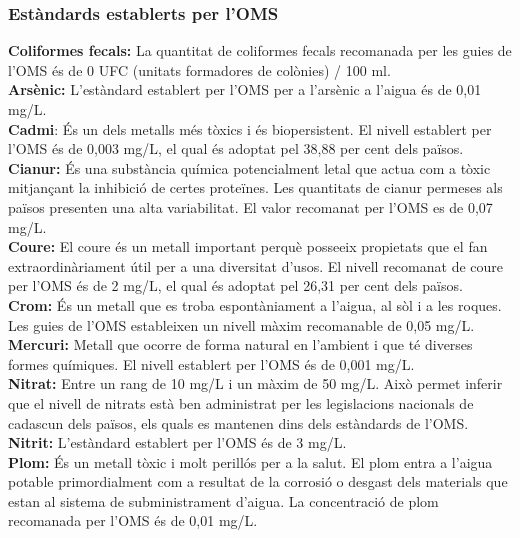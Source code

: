 \subsubsection{Estàndards establerts per l’OMS}
\textbf{Coliformes fecals:} La quantitat de coliformes fecals recomanada per les guies de l’OMS és de 0 UFC (unitats formadores de colònies) / 100 ml.\\

\textbf{Arsènic:} L’estàndard establert per l’OMS per a l’arsènic a l’aigua és de 0,01 mg/L.\\

\textbf{Cadmi}: És un dels metalls més tòxics i és biopersistent. El nivell establert per l’OMS és de 0,003 mg/L, el qual és adoptat pel 38,88 per cent dels països. \\

\textbf{Cianur:} És una substància química potencialment letal que actua com a tòxic mitjançant la inhibició de certes proteïnes. Les quantitats de cianur permeses als països presenten una alta variabilitat. El valor recomanat per l'OMS es de 0,07 mg/L.\\

\textbf{Coure:}  El coure és un metall important perquè posseeix propietats que el fan extraordinàriament útil per a una diversitat d’usos. El nivell recomanat de coure per l’OMS és de 2 mg/L, el qual és adoptat pel 26,31 per cent dels països.\\

\textbf{Crom:} És un metall que es troba espontàniament a l’aigua, al sòl i a les roques. Les guies de l’OMS estableixen un nivell màxim recomanable de 0,05 mg/L.\\

\textbf{Mercuri:} Metall que ocorre de forma natural en l’ambient i que té diverses formes químiques. El nivell establert per l’OMS és de 0,001 mg/L.\\

\textbf{Nitrat:} Entre un rang de 10 mg/L i un màxim de 50 mg/L. Això permet inferir que el nivell de nitrats està ben administrat per les legislacions nacionals de cadascun dels països, els quals es mantenen dins dels estàndards de l’OMS.\\

\textbf{Nitrit:} L’estàndard establert per l’OMS és de 3 mg/L.\\

\textbf{Plom:} És un metall tòxic i molt perillós per a la salut. El plom entra a l’aigua potable primordialment com a resultat de la corrosió o desgast dels materials que estan al sistema de subministrament d’aigua. La concentració de plom recomanada per l’OMS és de 0,01 mg/L.\\

